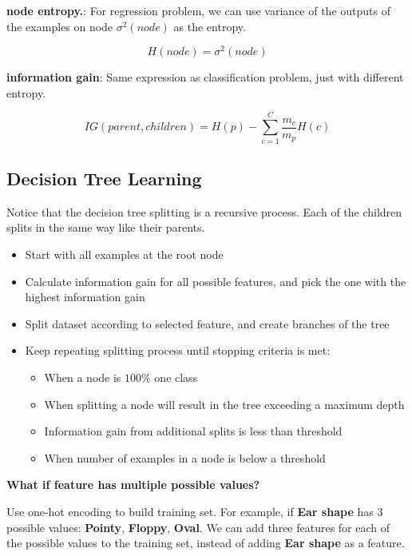 \documentclass{article}
\begin{document}
\noindent \textbf{node entropy.}: For regression problem, we can use variance of the outputs of the examples on node \(\sigma^{2}(node)\) as the entropy.

\[{H}(node) = \sigma^{2}(node)\]

\noindent \textbf{information gain}: Same expression as classification problem, just with different entropy.

\[{IG}(parent, children) = H(p) - \sum _{c=1}^{C}\frac{m_{c}}{m_{p}}{H}(c)\]

\subsection{Decision Tree Learning}

\noindent Notice that the decision tree splitting is a recursive process. Each of the children splits in the same way like their parents.

\begin{itemize}
    \item Start with all examples at the root node
    \item Calculate information gain for all possible features, and pick the one with
the highest information gain
    \item Split dataset according to selected feature, and create branches of the tree
    \item Keep repeating splitting process until stopping criteria is met:
    \begin{itemize}
        \item When a node is \(100\%\) one class
        \item When splitting a node will result in the tree exceeding a maximum
depth
        \item Information gain from additional splits is less than threshold
        \item When number of examples in a node is below a threshold
    \end{itemize}
\end{itemize}

\noindent \textbf{What if feature has multiple possible values?}

\noindent Use one-hot encoding to build training set. For example, if \textbf{Ear shape} has 3 possible values: \textbf{Pointy}, \textbf{Floppy}, \textbf{Oval}. We can add three features for each of the possible values to the training set, instead of adding \textbf{Ear shape} as a feature.

\bigskip
\end{document}
